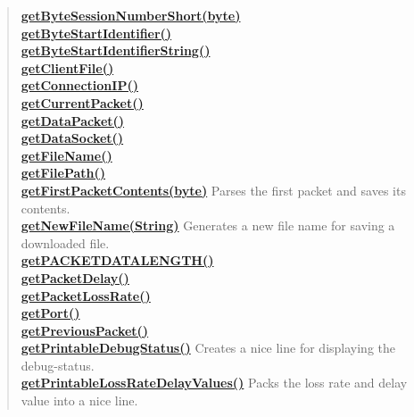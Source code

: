 {{{{{\begin{verse}
\hyperlink{filetransferUDP.FileTransfer.getByteSessionNumberShort(byte[])}{{\bf getByteSessionNumberShort(byte\lbrack \rbrack )}} \\
\hyperlink{filetransferUDP.FileTransfer.getByteStartIdentifier()}{{\bf getByteStartIdentifier()}} \\
\hyperlink{filetransferUDP.FileTransfer.getByteStartIdentifierString()}{{\bf getByteStartIdentifierString()}} \\
\hyperlink{filetransferUDP.FileTransfer.getClientFile()}{{\bf getClientFile()}} \\
\hyperlink{filetransferUDP.FileTransfer.getConnectionIP()}{{\bf getConnectionIP()}} \\
\hyperlink{filetransferUDP.FileTransfer.getCurrentPacket()}{{\bf getCurrentPacket()}} \\
\hyperlink{filetransferUDP.FileTransfer.getDataPacket()}{{\bf getDataPacket()}} \\
\hyperlink{filetransferUDP.FileTransfer.getDataSocket()}{{\bf getDataSocket()}} \\
\hyperlink{filetransferUDP.FileTransfer.getFileName()}{{\bf getFileName()}} \\
\hyperlink{filetransferUDP.FileTransfer.getFilePath()}{{\bf getFilePath()}} \\
\hyperlink{filetransferUDP.FileTransfer.getFirstPacketContents(byte[])}{{\bf getFirstPacketContents(byte\lbrack \rbrack )}} Parses the first packet and saves its contents.\\
\hyperlink{filetransferUDP.FileTransfer.getNewFileName(java.lang.String)}{{\bf getNewFileName(String)}} Generates a new file name for saving a downloaded file.\\
\hyperlink{filetransferUDP.FileTransfer.getPACKETDATALENGTH()}{{\bf getPACKETDATALENGTH()}} \\
\hyperlink{filetransferUDP.FileTransfer.getPacketDelay()}{{\bf getPacketDelay()}} \\
\hyperlink{filetransferUDP.FileTransfer.getPacketLossRate()}{{\bf getPacketLossRate()}} \\
\hyperlink{filetransferUDP.FileTransfer.getPort()}{{\bf getPort()}} \\
\hyperlink{filetransferUDP.FileTransfer.getPreviousPacket()}{{\bf getPreviousPacket()}} \\
\hyperlink{filetransferUDP.FileTransfer.getPrintableDebugStatus()}{{\bf getPrintableDebugStatus()}} Creates a nice line for displaying the debug-status.\\
\hyperlink{filetransferUDP.FileTransfer.getPrintableLossRateDelayValues()}{{\bf getPrintableLossRateDelayValues()}} Packs the loss rate and delay value into a nice line.\\

\end{verse}}}}}}
